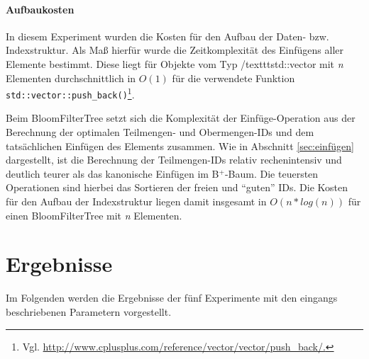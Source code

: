 \paragraph*{Aufbaukosten}
In diesem Experiment wurden die Kosten für den Aufbau der Daten- bzw. Indexstruktur. Als Maß hierfür wurde die Zeitkomplexität des Einfügens aller Elemente bestimmt. Diese liegt für Objekte vom Typ /texttt{std::vector} mit \textit{n} Elementen durchschnittlich in $O(1)$ für die verwendete Funktion \texttt{std::vector::push\_back()}\footnote{Vgl. \url{http://www.cplusplus.com/reference/vector/vector/push_back/.}}. 

\noindent
Beim BloomFilterTree setzt sich die Komplexität der Einfüge-Operation aus der Berechnung der optimalen Teilmengen- und Obermengen-IDs und dem tatsächlichen Einfügen des Elements zusammen. Wie in Abschnitt \ref{sec:einfügen} dargestellt, ist die Berechnung der Teilmengen-IDs relativ rechenintensiv und deutlich teurer als das kanonische Einfügen im B$^+$-Baum. Die teuersten Operationen sind hierbei das Sortieren der freien und "`guten"' IDs. Die Kosten für den Aufbau der Indexstruktur liegen damit insgesamt in $O(n\ast log(n))$ für einen BloomFilterTree mit \textit{n} Elementen. 
\section{Ergebnisse}\label{sec:ergebnisse}
Im Folgenden werden die Ergebnisse der fünf Experimente mit den eingangs beschriebenen Parametern vorgestellt. 
